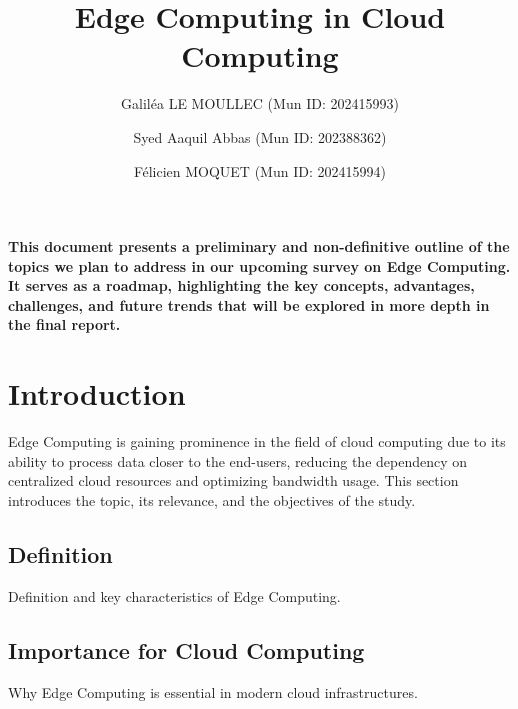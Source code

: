 \documentclass[runningheads]{llncs}
\begin{document}
\title{Edge Computing in Cloud Computing}


\author{Galiléa LE MOULLEC (Mun ID: 202415993) \and Syed Aaquil Abbas (Mun ID: 202388362) \and Félicien MOQUET (Mun ID: 202415994)}




\maketitle              %


\section*{}

\textbf{This document presents a preliminary and non-definitive outline of the topics we plan to address in our upcoming survey on Edge Computing. It serves as a roadmap, highlighting the key concepts, advantages, challenges, and future trends that will be explored in more depth in the final report.}

\section{Introduction}

Edge Computing is gaining prominence in the field of cloud computing due to its ability to process data closer to the end-users, reducing the dependency on centralized cloud resources and optimizing bandwidth usage. This section introduces the topic, its relevance, and the objectives of the study.

\subsection{Definition}
Definition and key characteristics of Edge Computing.

\subsection{Importance for Cloud Computing}
Why Edge Computing is essential in modern cloud infrastructures.
\end{document}
